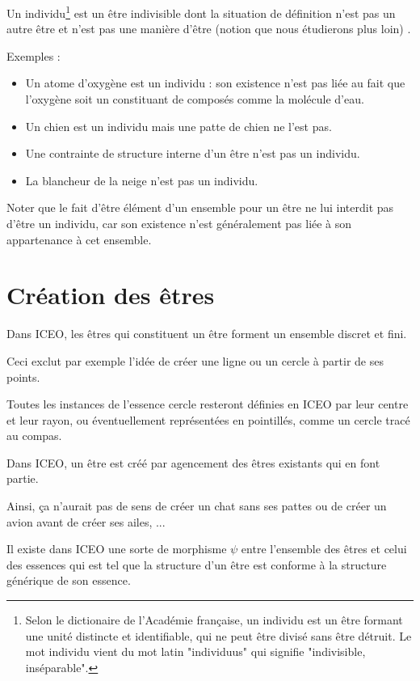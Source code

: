 \documentclass[a4paper, 12pt, openright, french]{book}
\begin{document}
Un individu\footnote{Selon le dictionaire de l'Académie française, un individu est un être formant une unité distincte et identifiable, qui ne peut être divisé sans être détruit. Le mot individu vient du mot latin "individuus" qui signifie "indivisible, inséparable".} est un être indivisible dont la situation de définition
n'est pas un autre être et n'est pas une
manière d'être (notion que nous étudierons plus loin) .

Exemples :

\begin{itemize}
	\item
	Un atome d'oxygène est un individu : son existence
	n'est pas liée au fait que l'oxygène
	soit un constituant de composés comme la molécule
	d'eau.
	\item
	Un chien est un individu mais une patte de chien ne
	l'est pas.
	\item
	Une contrainte de structure interne d'un être
	n'est pas un individu.
	\item
	La blancheur de la neige n'est pas un individu.
\end{itemize}

Noter que le fait d'être élément d'un
ensemble pour un être ne lui interdit pas d'être un
individu, car son existence n'est généralement pas liée
à son appartenance à cet ensemble.

\section{Création des êtres}

Dans ICEO, les êtres qui constituent un être forment un ensemble discret et fini. 

Ceci exclut par exemple l'idée de créer une ligne ou un cercle à partir de ses points.

Toutes les instances de l'essence cercle resteront définies en ICEO par leur centre et leur rayon, ou éventuellement représentées en pointillés, comme un cercle tracé au compas.

Dans ICEO, un être est créé par agencement des êtres existants qui en font partie.

Ainsi, ça n'aurait pas de sens de créer un chat sans ses
pattes ou de créer un avion avant de créer ses ailes, ...

Il existe dans ICEO une sorte de morphisme $\psi$ entre l'ensemble des
êtres et celui des essences qui est tel que la structure d'un être est
conforme à la structure générique de son essence.
\end{document}
